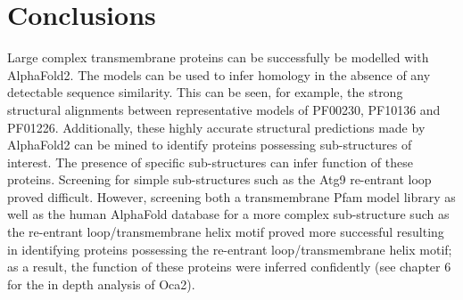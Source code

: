 \section{Conclusions}
Large complex transmembrane proteins can be successfully be modelled with AlphaFold2.  The models can be used to infer homology in the absence of any detectable sequence similarity.  This can be seen, for example, the strong structural alignments between representative models of PF00230, PF10136 and PF01226.  Additionally, these highly accurate structural predictions made by AlphaFold2 can be mined to identify proteins possessing sub-structures of interest.  The presence of specific sub-structures can infer function of these proteins. Screening for simple sub-structures such as the Atg9 re-entrant loop proved difficult.  However, screening both a transmembrane Pfam model library as well as the human AlphaFold database for a more complex sub-structure such as the  re-entrant loop/transmembrane helix motif proved more successful resulting in identifying proteins possessing the re-entrant loop/transmembrane helix motif; as a result, the function of these proteins were inferred confidently (see chapter 6 for the in depth analysis of Oca2).  






